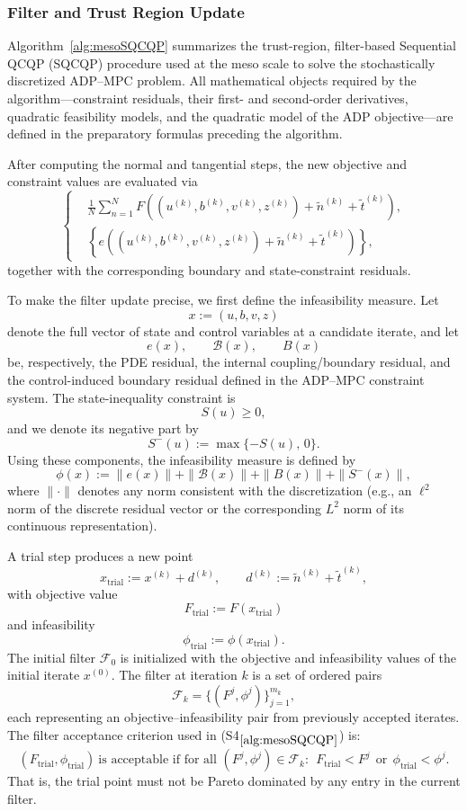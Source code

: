 \documentclass{article}
\newcommand{\1}{\mathds{1}}          %
\theoremstyle{definition}
\begin{document}
\begin{sloppypar}
\subsubsection{Filter and Trust Region Update}


Algorithm~\ref{alg:mesoSQCQP} summarizes the trust-region, filter-based
Sequential QCQP (SQCQP) procedure used at the meso scale to solve the
stochastically discretized ADP--MPC problem.  All mathematical objects
required by the algorithm---constraint residuals, their first- and
second-order derivatives, quadratic feasibility models, and the
quadratic model of the ADP objective---are defined in the preparatory
formulas preceding the algorithm.  

After computing the normal and tangential steps, the new objective and
constraint values are evaluated via
\[
\left\{
\begin{aligned}
&\frac{1}{N}\sum_{n=1}^N
F\!\left((u^{(k)},b^{(k)},v^{(k)},z^{(k)})
+ \tilde{n}^{(k)}+\tilde{t}^{(k)}\right), \\[4pt]
&\left\{
e\!\left((u^{(k)},b^{(k)},v^{(k)},z^{(k)})
+ \tilde{n}^{(k)}+\tilde{t}^{(k)}\right)
\right\},
\end{aligned}
\right.
\]
together with the corresponding boundary and state-constraint residuals.

To make the filter update precise, we first define the infeasibility
measure.  Let 
\[
x := (u,b,v,z)
\]
denote the full vector of state and control variables at a candidate
iterate, and let
\[
e(x),\qquad 
\mathcal B(x),\qquad
B(x)
\]
be, respectively, the PDE residual, the internal coupling/boundary
residual, and the control-induced boundary residual defined in the ADP--MPC
constraint system.  The state-inequality constraint is
\[
S(u) \ge 0,
\]
and we denote its negative part by
\[
S^{-}(u) := \max\{-S(u),\,0\}.
\]
Using these components, the infeasibility measure is defined by
\[
\phi(x) 
:= 
\|e(x)\|
+ \|\mathcal B(x)\|
+ \|B(x)\|
+ \|S^{-}(x)\|,
\]
where $\|\cdot\|$ denotes any norm consistent with the discretization
(e.g., an $\ell^2$ norm of the discrete residual vector or the
corresponding $L^2$ norm of its continuous representation).

A trial step produces a new point
\[
x_{\mathrm{trial}}
:= x^{(k)} + d^{(k)},
\qquad 
d^{(k)} := \tilde n^{(k)} + \tilde t^{(k)},
\]
with objective value
\[
F_{\mathrm{trial}}
:= F(x_{\mathrm{trial}})
\]
and infeasibility 
\[
\phi_{\mathrm{trial}}
:= \phi(x_{\mathrm{trial}}).
\]
The initial filter $\mathcal F_0$ is initialized with the objective and
infeasibility values of the initial iterate $x^{(0)}$. The filter at iteration $k$ is a set of ordered pairs
\[
\mathcal F_k 
= \{(F^{j},\phi^{j})\}_{j=1}^{m_k},
\]
each representing an objective--infeasibility pair from previously
accepted iterates.  The filter acceptance criterion used in 
(S4$_{\ref{alg:mesoSQCQP}}$) is:
\[
(F_{\mathrm{trial}},\phi_{\mathrm{trial}})
\ \text{is acceptable if for all } (F^{j},\phi^{j})\in \mathcal F_k:
\ \ 
F_{\mathrm{trial}} < F^{j}
\ \ \text{or} \ \
\phi_{\mathrm{trial}} < \phi^{j}.
\]
That is, the trial point must not be Pareto dominated by any entry in
the current filter.


\end{sloppypar}
\end{document}
